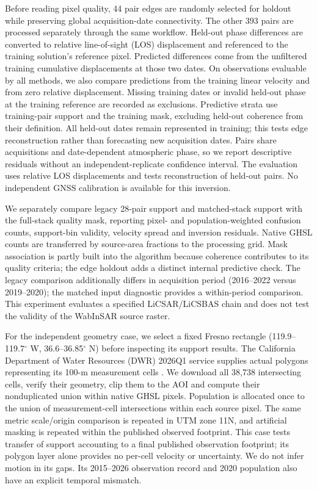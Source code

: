 \documentclass[pdflatex,sn-nature]{sn-jnl}
\begin{document}
Before reading pixel quality, 44 pair edges are randomly selected for holdout while preserving global acquisition-date connectivity. The other 393 pairs are processed separately through the same workflow. Held-out phase differences are converted to relative line-of-sight (LOS) displacement and referenced to the training solution's reference pixel. Predicted differences come from the unfiltered training cumulative displacements at those two dates. On observations evaluable by all methods, we also compare predictions from the training linear velocity and from zero relative displacement. Missing training dates or invalid held-out phase at the training reference are recorded as exclusions. Predictive strata use training-pair support and the training mask, excluding held-out coherence from their definition. All held-out dates remain represented in training; this tests edge reconstruction rather than forecasting new acquisition dates. Pairs share acquisitions and date-dependent atmospheric phase, so we report descriptive residuals without an independent-replicate confidence interval. The evaluation uses relative LOS displacements and tests reconstruction of held-out pairs. No independent GNSS calibration is available for this inversion.

We separately compare legacy 28-pair support and matched-stack support with the full-stack quality mask, reporting pixel- and population-weighted confusion counts, support-bin validity, velocity spread and inversion residuals. Native GHSL counts are transferred by source-area fractions to the processing grid. Mask association is partly built into the algorithm because coherence contributes to its quality criteria; the edge holdout adds a distinct internal predictive check. The legacy comparison additionally differs in acquisition period (2016--2022 versus 2019--2020); the matched input diagnostic provides a within-period comparison. This experiment evaluates a specified LiCSAR/LiCSBAS chain and does not test the validity of the WabInSAR source raster.


For the independent geometry case, we select a fixed Fresno rectangle (119.9--119.7$^\circ$ W, 36.6--36.85$^\circ$ N) before inspecting its support results. The California Department of Water Resources (DWR) 2026Q1 service supplies actual polygons representing its 100-m measurement cells \citep{dwr2026,dwrdocumentation}. We download all 38,738 intersecting cells, verify their geometry, clip them to the AOI and compute their nonduplicated union within native GHSL pixels. Population is allocated once to the union of measurement-cell intersections within each source pixel. The same metric scale/origin comparison is repeated in UTM zone 11N, and artificial masking is repeated within the published observed footprint. This case tests transfer of support accounting to a final published observation footprint; its polygon layer alone provides no per-cell velocity or uncertainty. We do not infer motion in its gaps. Its 2015--2026 observation record and 2020 population also have an explicit temporal mismatch.
\end{document}
